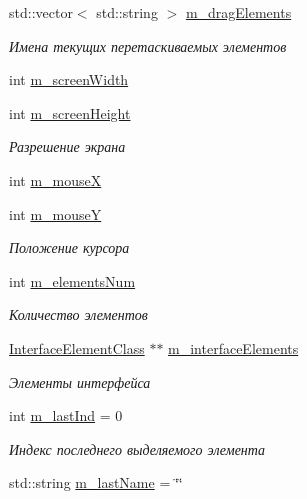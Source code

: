 \begin{DoxyCompactItemize}
\item 
std\+::vector$<$ std\+::string $>$ \hyperlink{class_interface_class_a9e61ef3ca261a0bec6fafe72a712b7ba}{m\+\_\+drag\+Elements}
\begin{DoxyCompactList}\small\item\em Имена текущих перетаскиваемых элементов \end{DoxyCompactList}\item 
int \hyperlink{class_interface_class_aab88d46230f91d664b0c97c8e8c1e00e}{m\+\_\+screen\+Width}
\item 
int \hyperlink{class_interface_class_a300a9b2379ed9c88e0c33fef734f8f6a}{m\+\_\+screen\+Height}
\begin{DoxyCompactList}\small\item\em Разрешение экрана \end{DoxyCompactList}\item 
int \hyperlink{class_interface_class_a93f81ffddb8f9cef5d3580e5c553ad29}{m\+\_\+mouseX}
\item 
int \hyperlink{class_interface_class_a468770cb6f5e29a0edb2b03453789b1a}{m\+\_\+mouseY}
\begin{DoxyCompactList}\small\item\em Положение курсора \end{DoxyCompactList}\item 
int \hyperlink{class_interface_class_aa7e526a6a1e36851104b33ccb54b2327}{m\+\_\+elements\+Num}
\begin{DoxyCompactList}\small\item\em Количество элементов \end{DoxyCompactList}\item 
\hyperlink{class_interface_element_class}{Interface\+Element\+Class} $\ast$$\ast$ \hyperlink{class_interface_class_a5ed2663897bdc04daabf3b4abcb527bd}{m\+\_\+interface\+Elements}
\begin{DoxyCompactList}\small\item\em Элементы интерфейса \end{DoxyCompactList}\item 
int \hyperlink{class_interface_class_a73a2baa4108fc83b7039ec1cb94e5e33}{m\+\_\+last\+Ind} = 0
\begin{DoxyCompactList}\small\item\em Индекс последнего выделяемого элемента \end{DoxyCompactList}\item 
std\+::string \hyperlink{class_interface_class_a8c97c3e540efa95abd78894c9624ccb0}{m\+\_\+last\+Name} = \char`\"{}\char`\"{}
$$
\end{DoxyCompactItemize}
